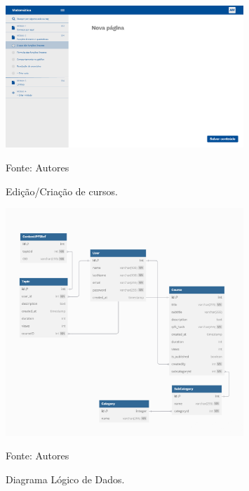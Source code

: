 \begin{apendicesenv}
    \begin{figure}[h]
        \centering
        \caption{Edição/Criação de cursos.}
        \includegraphics[width=0.8\textwidth]{figuras/Criando_curso.png}
        \begin{center}
            {\footnotesize Fonte: Autores}
        \end{center}
        \label{fig:Criando_curso}
    \end{figure}

    \begin{figure}[h]
        \centering
        \caption{Diagrama Lógico de Dados.}
        \includegraphics[width=0.8\textwidth]{figuras/ddl.png}
        \begin{center}
            {\footnotesize Fonte: Autores}
        \end{center}
        \label{fig:dld}
    \end{figure}


\end{apendicesenv}
